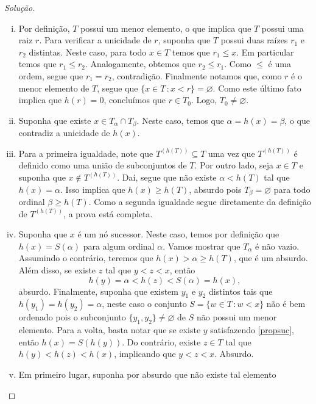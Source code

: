 \documentclass[a4paper]{article}
\theoremstyle{plain}\newtheorem{teo}{Teorema}[section]
\theoremstyle{plain}\newtheorem{prop}[teo]{Proposição}
\theoremstyle{plain}\newtheorem{lem}[teo]{Lema}
\theoremstyle{plain}\newtheorem{cor}[teo]{Corolário}
\theoremstyle{definition}\newtheorem{defi}[teo]{Definição}
\theoremstyle{remark}\newtheorem{rem}[teo]{Observação}
\theoremstyle{definition}\newtheorem{example}[teo]{Exemplo}
\theoremstyle{remark}\newtheorem{step}{\bf Step}
\begin{document}
\begin{proof}[Solução]\hfill
  \begin{enumerate}[(i)]
  \item Por definição, \(T\) possui um menor
    elemento, o que implica que \(T\) possui uma raiz \(r\). Para verificar a
    unicidade de \(r\), suponha que \(T\) possui duas raízes \(r_1\) e \(r_2\)
    distintas. Neste caso,  para todo \(x\in T\) temos que
    \(r_1\leq x\). Em particular temos que
    \(r_1\leq r_2\). Analogamente, obtemos que \(r_2\leq r_1\). Como \(\leq\) é
    uma ordem, segue que \(r_1=r_2\), contradição. Finalmente notamos que,
    como \(r\) é o menor elemento de \(T\), segue que \(\{x\in T\,\colon
    x<r\}=\varnothing\). Como este último fato implica que \(h(r)=0\), concluímos que
    \(r\in T_0\). Logo, \(T_0\not=\varnothing\).
  \item Suponha que existe \(x\in T_\alpha\cap T_\beta\). Neste caso, temos que
    \(\alpha=h(x)=\beta\), o que contradiz a unicidade de \(h(x)\).
  \item Para a primeira igualdade, note que \(T^{(h(T))}\subseteq T\) uma vez
    que \(T^{(h(T))}\) é definido como uma união de subconjuntos de \(T\). Por
    outro lado, seja \(x\in T\) e suponha que \(x\not\in T^{(h(T))}\). Daí,
    segue que não existe \(\alpha < h(T)\) tal que \(h(x)=\alpha\). Isso implica
    que \(h(x)\geq h(T)\), absurdo pois \(T_\beta=\varnothing\) para todo
    ordinal \(\beta \geq h(T)\). Como a segunda igualdade segue diretamente da
    definição de \(T^{(h(T))}\), a prova está completa. 
  \item Suponha que \(x\) é um nó sucessor. Neste caso, temos por definição
    que \(h(x)=S(\alpha)\) para algum ordinal \(\alpha\). Vamos mostrar que
    \(T_\alpha\) é não vazio. Assumindo o contrário, teremos que
    \(h(x)>\alpha\geq h(T)\), que é um absurdo. Além disso,
    se  existe \(z\) tal que \(y<z<x\), então
    \[h(y)=\alpha<h(z)<S(\alpha)=h(x),\] absurdo. Finalmente, suponha que
    existem \(y_1\)
    e \(y_2\) distintos tais que \(h(y_1)=h(y_2)=\alpha\), neste caso o conjunto \(S=\{w\in
    T\,\colon w <x\}\) não é bem ordenado pois o subconjunto
    \(\{y_1,y_2\}\not = \varnothing\) de \(S\) não possui um menor elemento.
    Para a volta, basta notar que se existe \(y\) satisfazendo
    \eqref{propsuc}, então \(h(x)=S(h(y))\). Do contrário, existe \(z\in T\) tal
    que \(h(y)<h(z)<h(x)\), implicando que \(y<z<x\). Absurdo.
  \item Em primeiro lugar, suponha por absurdo que não existe tal elemento

\end{enumerate}
\end{proof}
\end{document}
